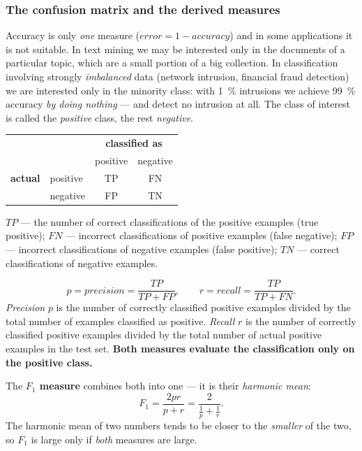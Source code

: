 \documentclass[11pt,a4paper]{article}
\theoremstyle{definition}
\begin{document}
\subsubsection{The confusion matrix and the derived measures}

Accuracy is only \emph{one} measure ($\mathit{error}=1-\mathit{accuracy}$) and in some applications
it is not suitable. In text mining we may be interested only in the documents of a particular
topic, which are a small portion of a big collection. In classification involving strongly
\emph{imbalanced} data (network intrusion, financial fraud detection) we are interested only in the
minority class: with 1~\% intrusions we achieve 99~\% accuracy \emph{by doing nothing} --- and
detect no intrusion at all. The class of interest is called the \emph{positive} class, the rest
\emph{negative}.

\begin{defbox}
\begin{center}
\small
\begin{tabular}{@{}llcc@{}}
\toprule
& & \multicolumn{2}{c}{\textbf{classified as}} \\
& & positive & negative \\
\midrule
\textbf{actual} & positive & TP & FN \\
                & negative & FP & TN \\
\bottomrule
\end{tabular}
\end{center}
$TP$ --- the number of correct classifications of the positive examples (true positive); $FN$ ---
incorrect classifications of positive examples (false negative); $FP$ --- incorrect classifications
of negative examples (false positive); $TN$ --- correct classifications of negative examples.

\[ p=\mathit{precision}=\frac{TP}{TP+FP},\qquad r=\mathit{recall}=\frac{TP}{TP+FN}. \]
\emph{Precision} $p$ is the number of correctly classified positive examples divided by the total
number of examples classified as positive. \emph{Recall} $r$ is the number of correctly classified
positive examples divided by the total number of actual positive examples in the test set.
\textbf{Both measures evaluate the classification only on the positive class.}

The \textbf{$F_1$ measure} combines both into one --- it is their \emph{harmonic mean}:
\[ F_1=\frac{2pr}{p+r}=\frac{2}{\frac1p+\frac1r}. \]
The harmonic mean of two numbers tends to be closer to the \emph{smaller} of the two, so $F_1$ is
large only if \emph{both} measures are large.
\end{defbox}
\end{document}
